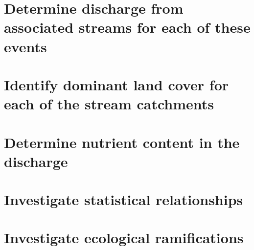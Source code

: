 \documentclass{article}
\begin{document}
\section*{Determine discharge from associated streams for each of these events}

\section*{Identify dominant land cover for each of the stream catchments}

\section*{Determine nutrient content in the discharge}

\section*{Investigate statistical relationships}

\section*{Investigate ecological ramifications}
\end{document}
